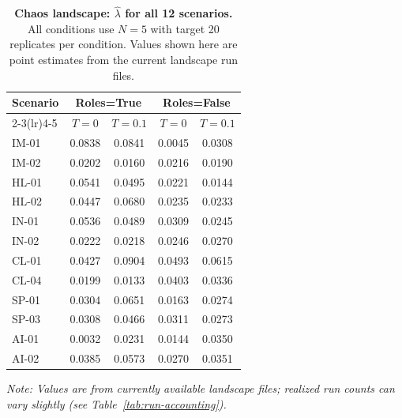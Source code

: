 \documentclass[11pt,onecolumn]{article}
\newcommand{\lam}{\ensuremath{\hat{\lambda}}}
\begin{document}
\begin{table}[H]
\caption{\textbf{Chaos landscape: $\lam$ for all 12 scenarios.}
  All conditions use $N=5$ with target 20 replicates per condition.
  Values shown here are point estimates from the current landscape run files.}
\label{tab:landscape}
\small
\begin{tabular}{@{}lcccc@{}}
\toprule
\textbf{Scenario} & \multicolumn{2}{c}{\textbf{Roles=True}} & \multicolumn{2}{c}{\textbf{Roles=False}} \\
\cmidrule(lr){2-3}\cmidrule(lr){4-5}
& $T=0$ & $T=0.1$ & $T=0$ & $T=0.1$ \\
\midrule
IM-01 & 0.0838 & 0.0841 & 0.0045 & 0.0308 \\
IM-02 & 0.0202 & 0.0160 & 0.0216 & 0.0190 \\
HL-01 & 0.0541 & 0.0495 & 0.0221 & 0.0144 \\
HL-02 & 0.0447 & 0.0680 & 0.0235 & 0.0233 \\
IN-01 & 0.0536 & 0.0489 & 0.0309 & 0.0245 \\
IN-02 & 0.0222 & 0.0218 & 0.0246 & 0.0270 \\
CL-01 & 0.0427 & 0.0904 & 0.0493 & 0.0615 \\
CL-04 & 0.0199 & 0.0133 & 0.0403 & 0.0336 \\
SP-01 & 0.0304 & 0.0651 & 0.0163 & 0.0274 \\
SP-03 & 0.0308 & 0.0466 & 0.0311 & 0.0273 \\
AI-01 & 0.0032 & 0.0231 & 0.0144 & 0.0350 \\
AI-02 & 0.0385 & 0.0573 & 0.0270 & 0.0351 \\
\bottomrule
\end{tabular}
\end{table}

\noindent\textit{Note: Values are from currently available landscape files;
realized run counts can vary slightly (see Table~\ref{tab:run-accounting}).}
\end{document}
